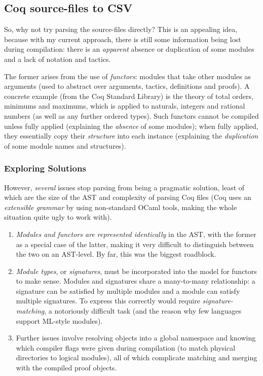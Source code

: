 \subsection{Coq source-files to CSV}

So, why not try parsing the source-files directly? This is an appealing idea,
because with my current approach, there is still some information being lost
during compilation: there is an \emph{apparent} absence or duplication of some
modules and a lack of notation and tactics.

The former arises from the use of \emph{functors}: modules that take other
modules as arguments (used to abstract over arguments, tactics, definitions and
proofs). A concrete example (from the Coq Standard Library) is the theory of
total orders, minimums and maximums, which is applied to naturals, integers and
rational numbers (as well as any further ordered types). Such functors cannot be
compiled unless fully applied (explaining the \emph{absence} of some modules);
when fully applied, they essentially copy their \emph{structure} into each
instance (explaining the \emph{duplication} of some module names and
structures).

\subsubsection{Exploring Solutions}

However, \emph{several} issues stop parsing from being a pragmatic solution,
least of which are the size of the AST and complexity of parsing Coq files (Coq
uses an \emph{extensible grammar} by using non-standard OCaml tools, making the
whole situation quite ugly to work with).

\begin{enumerate}

  \item \emph{Modules and functors are represented identically} in the AST, with
    the former as a special case of the latter, making it very difficult to
    distinguish between the two on an AST-level. By far, this was the biggest
    roadblock.

  \item \emph{Module types}, or \emph{signatures}, must be incorporated into
    the model for functors to make sense. Modules and signatures share a
    many-to-many relationship: a signature can be satisfied by multiple modules
    and a module can satisfy multiple signatures. To express this correctly
    would require \emph{signature-matching}, a notoriously difficult task (and
    the reason why few languages support ML-style modules).

  \item Further issues involve resolving objects into a global namespace and
    knowing which compiler flags were given during compilation (to match
    physical directories to logical modules), all of which complicate matching
    and merging with the compiled proof objects.

\end{enumerate}

